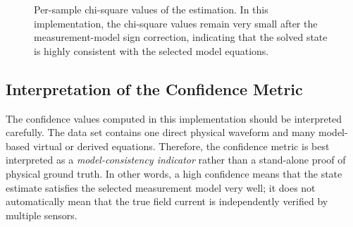 \documentclass[11pt]{article}
\begin{document}
\begin{figure}[H]
  \centering
  \caption{Per-sample chi-square values of the estimation. In this implementation, the chi-square
  values remain very small after the measurement-model sign correction, indicating that the solved
  state is highly consistent with the selected model equations.}
  \label{fig:chi-square-events}
\end{figure}

\subsection{Interpretation of the Confidence Metric}
The confidence values computed in this implementation should be interpreted carefully. The data set
contains one direct physical waveform and many model-based virtual or derived equations. Therefore,
the confidence metric is best interpreted as a \emph{model-consistency indicator} rather than a
stand-alone proof of physical ground truth. In other words, a high confidence means that the state
estimate satisfies the selected measurement model very well; it does not automatically mean that
the true field current is independently verified by multiple sensors.
\end{document}
